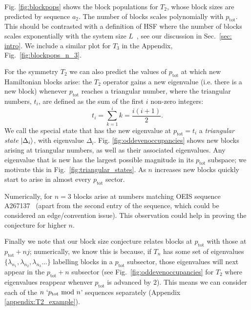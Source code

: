 \documentclass[aps,prx,10pt,twocolumn,amsmath,amssymb,superscriptaddress]{revtex4-2}
\newcommand{\ptot}{p_{\mathrm{tot}}}
\theoremstyle{definition}
\theoremstyle{definition}
\begin{document}
Fig. \ref{fig:blockpops} shows the block populations for $T_2$, whose block sizes are predicted by sequence $a_2$. The number of blocks scales polynomially with $\ptot$. This should be contrasted with a definition of HSF where the number of blocks scales exponentially with the system size $L$~\cite{Moudgalya_2022}, see our discussion in Sec.~\ref{sec: intro}. We include a similar plot for $T_3$ in the Appendix, Fig.~\ref{fig:blockpops_n_3}.

For the symmetry $T_2$ we can also predict the values of $\ptot$ at which new Hamiltonian blocks arise: the $T_2$ operator gains a new eigenvalue (i.e. there is a new block) whenever $\ptot$ reaches a triangular number, where the triangular numbers, $t_i$, are defined as the sum of the first $i$ non-zero integers: 
\begin{equation} \label{eq:triang_nums}
    t_i = \sum_{k=1}^{i} k = \frac{i (i+1)}{2}.
\end{equation} We call the special state that has the new eigenvalue at $\ptot = t_i$ a \textit{triangular state} $\ket{\Delta_i}$, with eigenvalue $\Delta_i$. Fig. \ref{fig:oddevenoccupancies} shows new blocks arising at triangular numbers, as well as their associated eigenvalues. Any  eigenvalue that is new has the largest possible magnitude in its $\ptot$ subspace; we motivate this in Fig.~\ref{fig:triangular_states}. As $n$ increases new blocks quickly start to arise in almost every $\ptot$ sector.

Numerically, for $n=3$ blocks arise at numbers matching OEIS sequence A267137~\cite{OEIS_sequence_n_3} (apart from the second entry of the sequence, which could be considered an edge/convention issue). This observation could help in proving the conjecture for higher $n$.

Finally we note that our block size conjecture relates blocks at $\ptot$ with those at $\ptot + nj$; numerically, we know this is because, if $T_n$ has some set of eigenvalues $\{\lambda_{n_1}, \lambda_{n_2}, \lambda_{n_3}...\}$ labelling blocks in a $\ptot$ subsector, those eigenvalues will next appear in the $\ptot + n$ subsector (see Fig.~\ref{fig:oddevenoccupancies} for $T_2$ where eigenvalues reappear whenver $\ptot$ is advanced by $2$). This means we can consider each of the $n \ `\ptot \ \text{mod} \ n$' sequences separately (Appendix \ref{appendix:T2_example}).
\end{document}
